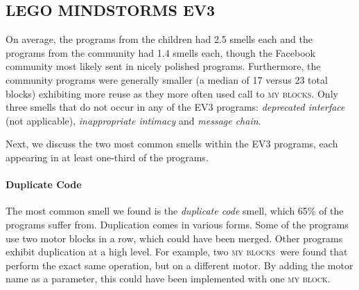 \documentclass[conference]{IEEEtran}
\newcommand{\ms}{LEGO MINDSTORMS EV3}
\newcommand{\mbs}{\textsc{my blocks}}
\newcommand{\mb}{\textsc{my block}}
\begin{document}


\subsection{\ms}
On average, the programs from the children had 2.5 smells each and the programs from the community  had 1.4 smells each, though  the Facebook community most likely sent in nicely polished programs. Furthermore, the community programs were generally smaller (a median of 17 versus 23 total blocks) exhibiting more reuse as they more often used call to \mbs. 
Only three smells that do not occur in any of the EV3 programs: \emph{deprecated interface} (not applicable), \emph{inappropriate intimacy} and \emph{message chain}.

Next, we discuss the two most common smells within the EV3 programs, each appearing in at least one-third of the programs. 



\paragraph{Duplicate Code}
The most common smell we found  is the \emph{duplicate code} smell, which 65\% of the programs suffer from. Duplication comes in various forms.  Some of the programs use two motor blocks in a row, which could have been merged. Other programs exhibit duplication at a high level. For example,  two \mbs~were found that perform the exact same operation, but on a different motor. By adding the motor name as a parameter, this could have been implemented with one \mb.
\end{document}
